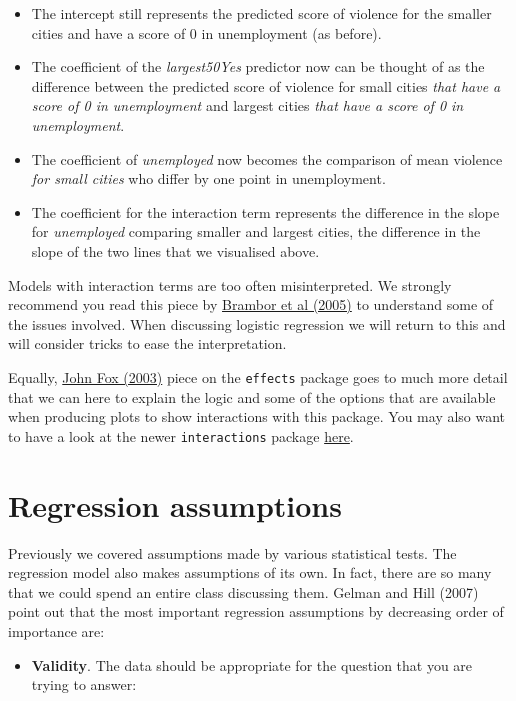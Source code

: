 \documentclass[
]{book}
\providecommand{\tightlist}{%
  \setlength{\itemsep}{0pt}\setlength{\parskip}{0pt}}
\begin{document}
\begin{itemize}
\item
  The intercept still represents the predicted score of violence for the smaller cities and have a score of 0 in unemployment (as before).
\item
  The coefficient of the \emph{largest50Yes} predictor now can be thought of as the difference between the predicted score of violence for small cities \emph{that have a score of 0 in unemployment} and largest cities \emph{that have a score of 0 in unemployment}.
\item
  The coefficient of \emph{unemployed} now becomes the comparison of mean violence \emph{for small cities} who differ by one point in unemployment.
\item
  The coefficient for the interaction term represents the difference in the slope for \emph{unemployed} comparing smaller and largest cities, the difference in the slope of the two lines that we visualised above.
\end{itemize}

Models with interaction terms are too often misinterpreted. We strongly recommend you read this piece by \href{https://files.nyu.edu/mrg217/public/pa_final.pdf}{Brambor et al (2005)} to understand some of the issues involved. When discussing logistic regression we will return to this and will consider tricks to ease the interpretation.

Equally, \href{http://www.jstatsoft.org/v08/i15/paper}{John Fox (2003)} piece on the \texttt{effects} package goes to much more detail that we can here to explain the logic and some of the options that are available when producing plots to show interactions with this package. You may also want to have a look at the newer \texttt{interactions} package \href{https://interactions.jacob-long.com/index.html}{here}.

\section{Regression assumptions}\label{regression-assumptions}

Previously we covered assumptions made by various statistical tests. The regression model also makes assumptions of its own. In fact, there are so many that we could spend an entire class discussing them. Gelman and Hill (2007) point out that the most important regression assumptions by decreasing order of importance are:

\begin{itemize}
\tightlist
\item
  \textbf{Validity}. The data should be appropriate for the question that you are trying to answer:
\end{itemize}
\end{document}
